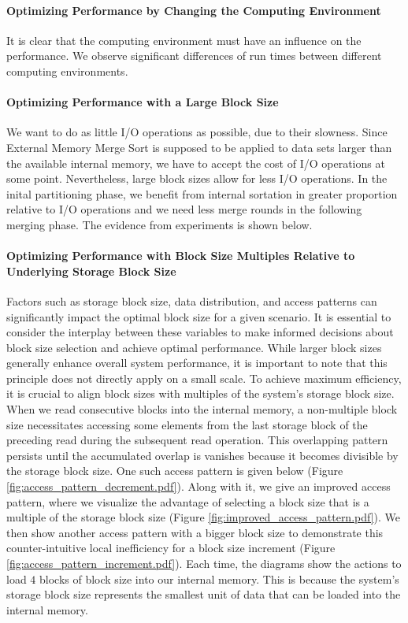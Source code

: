 \documentclass[twocolumn]{article}
\begin{document}
\paragraph*{Optimizing Performance by Changing the Computing Environment}
It is clear that the computing environment must have an influence on the performance.
We observe significant differences of run times between different computing environments.
\paragraph*{Optimizing Performance with a Large Block Size}
We want to do as little I/O operations as possible, due to their slowness. Since External Memory Merge Sort is supposed to be applied to data sets larger than the available internal memory,
we have to accept the cost of I/O operations at some point. Nevertheless, large block sizes allow for less I/O operations. In the inital partitioning phase, we benefit from internal sortation
in greater proportion relative to I/O operations and we need less merge rounds in the following merging phase.
The evidence from experiments is shown below.
\paragraph*{Optimizing Performance with Block Size Multiples Relative to Underlying Storage Block Size}
\label{par:storage_block_size}
Factors such as storage block size, data distribution, and access patterns can significantly impact the optimal block size for a given scenario.
It is essential to consider the interplay between these variables to make informed decisions about block size selection and achieve optimal performance.
While larger block sizes generally enhance overall system performance, it is important to note that this principle does not directly apply on a small scale.
To achieve maximum efficiency, it is crucial to align block sizes with multiples of the system's storage block size.
When we read consecutive blocks into the internal memory, a non-multiple block size necessitates accessing some elements from the last storage block of the
preceding read during the subsequent read operation.
This overlapping pattern persists until the accumulated overlap is vanishes because it becomes divisible by the storage block size.
One such access pattern is given below (Figure \ref{fig:access_pattern_decrement.pdf}). Along with it, we give an improved access pattern, where we visualize the advantage of selecting
a block size that is a multiple of the storage block size (Figure \ref{fig:improved_access_pattern.pdf}). We then show another access pattern with a bigger block size to demonstrate
this counter-intuitive local inefficiency for a block size increment (Figure \ref{fig:access_pattern_increment.pdf}). Each time, the diagrams show the actions to load \( 4 \) blocks of block size
into our internal memory.
This is because the system's storage block size represents the smallest unit of data that can be loaded into the internal memory.
\end{document}
